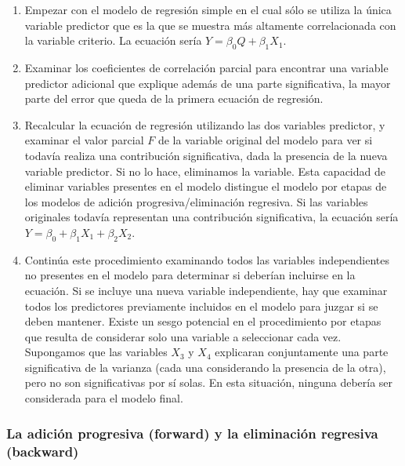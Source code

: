 \documentclass[
  12pt,
]{krantz}
\theoremstyle{definition}
\theoremstyle{definition}
\theoremstyle{definition}
\theoremstyle{remark}
\begin{document}
\begin{enumerate}
\def\labelenumi{\arabic{enumi}.}
\item
  Empezar con el modelo de regresión simple en el cual sólo se utiliza la única variable predictor que es la que se muestra más altamente correlacionada con la variable criterio. La ecuación sería \(Y= \beta_0 Q + \beta_1X_1\).
\item
  Examinar los coeficientes de correlación parcial para encontrar una variable predictor adicional que explique además de una parte significativa, la mayor parte del error que queda de la primera ecuación de regresión.
\item
  Recalcular la ecuación de regresión utilizando las dos variables predictor, y examinar el valor parcial \(F\) de la variable original del modelo para ver si todavía realiza una contribución significativa, dada la presencia de la nueva variable predictor. Si no lo hace, eliminamos la variable. Esta capacidad de eliminar variables presentes en el modelo distingue el modelo por etapas de los modelos de adición progresiva/eliminación regresiva. Si las variables originales todavía representan una contribución significativa, la ecuación sería \(Y = \beta_0 + \beta_1X_1 + \beta_2X_2\).
\item
  Continúa este procedimiento examinando todos las variables independientes no presentes en el modelo para determinar si deberían incluirse en la ecuación. Si se incluye una nueva variable independiente, hay que examinar todos los predictores previamente incluidos en el modelo para juzgar si se deben mantener. Existe un sesgo potencial en el procedimiento por etapas que resulta de considerar solo una variable a seleccionar cada vez. Supongamos que las variables \(X_3\) y \(X_4\) explicaran conjuntamente una parte significativa de la varianza (cada una considerando la presencia de la otra), pero no son significativas por sí solas. En esta situación, ninguna debería ser considerada para el modelo final.
\end{enumerate}

\hypertarget{la-adicion-progresiva-forward-y-la-eliminacion-regresiva-backward}{%
\subsubsection{La adición progresiva (forward) y la eliminación regresiva (backward)}\label{la-adicion-progresiva-forward-y-la-eliminacion-regresiva-backward}}
\end{document}
